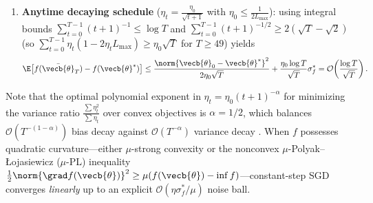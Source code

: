 \documentclass[../../../../master.tex]{subfiles}
\begin{document}
\begin{coremath}
\begin{enumerate}
\begin{equation}
  \label{eq:sgd:convex-const}
  \E\bigl[f(\bar{\vecb{\theta}}_T) - f(\vecb{\theta}^*)\bigr]
  \le \frac{\norm{\vecb{\theta}_0 - \vecb{\theta}^*}^2}{2\eta(1 - 2\eta L_{\max})T} + \frac{\eta}{1 - 2\eta L_{\max}}\sigma_f^*.
  \end{equation}
  If interpolation holds ($\sigma_f^* = 0$), constant-step SGD matches deterministic GD's $\mathcal{O}(1/T)$ rate. Otherwise, a fixed horizon choice $\eta = \frac{1}{2L_{\max}\sqrt{T}}$ (for $T \ge 4$) recovers $\mathcal{O}(1/\sqrt{T})$ rate and $\mathcal{O}(1/\varepsilon^2)$ complexity .
  \item \textbf{Anytime decaying schedule} ($\eta_t = \frac{\eta_0}{\sqrt{t+1}}$ with $\eta_0 \le \frac{1}{2L_{\max}}$): using integral bounds $\sum_{t=0}^{T-1} (t+1)^{-1} \le \log T$ and $\sum_{t=0}^{T-1}(t+1)^{-1/2} \ge 2(\sqrt{T} - \sqrt{2})$ (so $\sum_{t=0}^{T-1}\eta_t(1-2\eta_t L_{\max}) \ge \eta_0\sqrt{T}$ for $T \ge 49$) yields
  \begin{equation}
  \label{eq:sgd:convex-decay}
  \E\bigl[f(\bar{\vecb{\theta}}_T) - f(\vecb{\theta}^*)\bigr]
  \le \frac{\norm{\vecb{\theta}_0 - \vecb{\theta}^*}^2}{2\eta_0\sqrt{T}} + \frac{\eta_0 \log T}{\sqrt{T}}\sigma_f^*
  = \mathcal{O}\!\left(\frac{\log T}{\sqrt{T}}\right).
  \end{equation}
\end{enumerate}
\end{coremath}

Note that the optimal polynomial exponent in $\eta_t = \eta_0 (t+1)^{-\alpha}$ for minimizing the variance ratio $\frac{\sum \eta_t^2}{\sum \eta_t}$ over convex objectives is $\alpha = 1/2$, which balances $\mathcal{O}(T^{-(1-\alpha)})$ bias decay against $\mathcal{O}(T^{-\alpha})$ variance decay  . When $f$ possesses quadratic curvature---either $\mu$-strong convexity or the nonconvex $\mu$-Polyak--\L{}ojasiewicz ($\mu$-PL) inequality $\frac{1}{2}\norm{\grad f(\vecb{\theta})}^2 \ge \mu(f(\vecb{\theta}) - \inf f)$---constant-step SGD converges \emph{linearly} up to an explicit $\mathcal{O}(\eta \sigma_f^*/\mu)$ noise ball.
\end{document}
